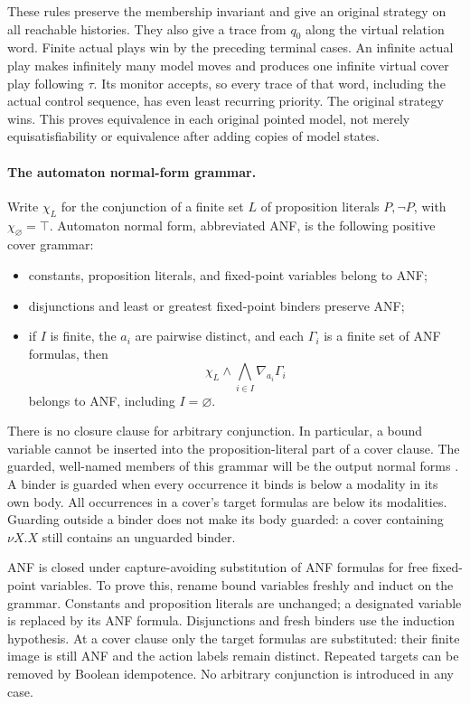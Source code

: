 These rules preserve the
membership invariant and give
an original strategy on all
reachable histories.
They also give a trace from
\(q_0\) along the virtual
relation word.
Finite actual plays win by
the preceding terminal cases.
An infinite actual play makes
infinitely many model moves
and produces one infinite
virtual cover play following
\(\tau\). Its monitor accepts,
so every trace of that word,
including the actual control
sequence, has even least
recurring priority.
The original strategy wins.
This proves equivalence in
each original pointed model,
not merely equisatisfiability
or equivalence after adding
copies of model states.

\paragraph{The automaton normal-form grammar.}
\label{sec:p09-mu-anf-grammar}
Write \(\chi_L\) for the conjunction
of a finite set \(L\) of
proposition literals \(P,\neg P\),
with \(\chi_\varnothing=\top\).
Automaton normal form, abbreviated
ANF, is the following positive
cover grammar:
\begin{itemize}
\item constants, proposition literals,
and fixed-point variables belong
to ANF;
\item disjunctions and least or
greatest fixed-point binders
preserve ANF;
\item if \(I\) is finite,
the \(a_i\) are pairwise distinct,
and each \(\Gamma_i\) is a
finite set of ANF formulas, then
\[
 \chi_L\land\bigwedge_{i\in I}
                            \nabla_{a_i}\Gamma_i
\]
belongs to ANF, including
\(I=\varnothing\).
\end{itemize}
There is no closure clause
for arbitrary conjunction.
In particular, a bound variable
cannot be inserted into the
proposition-literal part of a
cover clause.
The guarded, well-named members
of this grammar will be the
output normal forms
\cite[def.~4.1]{JaninWalukiewicz1995}.
A binder is guarded when every
occurrence it binds is below
a modality in its own body.
All occurrences in a cover's
target formulas are below its
modalities. Guarding outside
a binder does not make its
body guarded: a cover containing
\(\nu X.X\) still contains
an unguarded binder.

ANF is closed under capture-avoiding
substitution of ANF formulas
for free fixed-point variables.
To prove this, rename bound
variables freshly and induct
on the grammar. Constants
and proposition literals are
unchanged; a designated variable
is replaced by its ANF formula.
Disjunctions and fresh binders
use the induction hypothesis.
At a cover clause only the
target formulas are substituted:
their finite image is still
ANF and the action labels
remain distinct. Repeated
targets can be removed by
Boolean idempotence.
No arbitrary conjunction is
introduced in any case.

